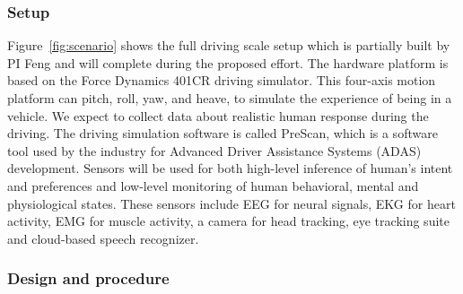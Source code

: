 \subsubsection{Setup}
Figure~\ref{fig:scenario} shows the full driving scale setup which is partially built by PI Feng and will complete during the proposed effort. The hardware platform is based on the Force Dynamics 401CR driving simulator. This four-axis motion platform can pitch, roll, yaw, and heave, to simulate the experience of being in a vehicle. We expect to collect data about realistic human response during the driving. The driving simulation software is called PreScan, which is a software tool used by the industry for Advanced Driver Assistance Systems (ADAS) development. 
Sensors will be used for both high-level inference of human's intent and preferences and low-level monitoring of human behavioral, mental and physiological states. These sensors include EEG for neural signals, EKG for heart activity, EMG for muscle activity, a camera for head tracking, eye tracking suite and cloud-based speech recognizer.
\vspace{-5pt}
\subsubsection{Design and procedure}

